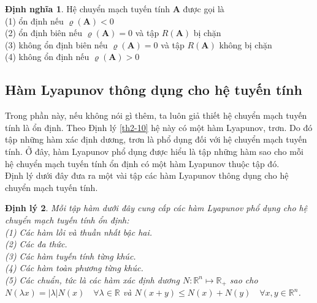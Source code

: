 \documentclass[14pt,a4paper,oneside]{report}		%
\newtheorem{theorem}{Định lý}[chapter]
\theoremstyle{definition}
\newtheorem{define}[theorem]{Định nghĩa}
\begin{document}
\begin{define}\label{def2-17}
Hệ chuyển mạch tuyến tính $\mathbf{A}$ được gọi là \\
(1) ổn định nếu $\varrho(\mathbf{A})<0$\\
(2) ổn định biên nếu $\varrho(\mathbf{A})=0$ và tập $R(\mathbf{A})$ bị chặn\\
(3) không ổn định biên nếu $\varrho(\mathbf{A})=0$ và tập $R(\mathbf{A})$ không bị chặn\\
(4) không ổn định nếu $\varrho(\mathbf{A})>0$
\end{define}

\subsection{Hàm Lyapunov thông dụng cho hệ tuyến tính}
Trong phần này, nếu không nói gì thêm, ta luôn giả thiết hệ chuyển mạch tuyến tính là ổn định. Theo Định lý \ref{th2-10} hệ này có một hàm Lyapunov, trơn. Do đó tập những hàm xác định dương, trơn là phổ dụng đối với hệ chuyển mạch tuyến tính. Ở đây, hàm Lyapunov phổ dụng được hiểu là tập những hàm sao cho mỗi hệ chuyển mạch tuyến tính ổn định có một hàm Lyapunov thuộc tập đó.\\

Định lý dưới đây đưa ra một vài tập các hàm Lyapunov thông dụng cho hệ chuyển mạch tuyến tính.

\begin{theorem} \label{the2-18}
Mỗi tập hàm dưới đây cung cấp các hàm Lyapunov phổ dụng cho hệ chuyển mạch tuyến tính ổn định:\\
(1) Các hàm lồi và thuần nhất bậc hai.\\
(2) Các đa thức.\\
(3) Các hàm tuyến tính từng khúc.\\
(4) Các hàm toàn phương từng khúc.\\
(5) Các chuẩn, tức là các hàm xác định dương $N:\mathbb{R}^n\mapsto\mathbb{R}_+$ sao cho $N(\lambda x)=|\lambda|N(x)\quad\forall\lambda\in\mathbb{R}$ và $N(x+y)\leq N(x)+N(y)\quad\forall x,y\in\mathbb{R}^n$.
\end{theorem}
\end{document}
